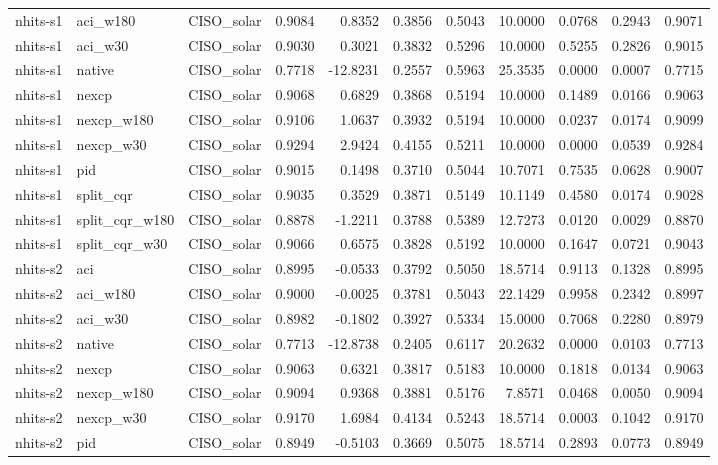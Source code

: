 \begin{tabular}{lllrrrrrrrr}
nhits-s1 & aci_w180 & CISO_solar & 0.9084 & 0.8352 & 0.3856 & 0.5043 & 10.0000 & 0.0768 & 0.2943 & 0.9071 \\
nhits-s1 & aci_w30 & CISO_solar & 0.9030 & 0.3021 & 0.3832 & 0.5296 & 10.0000 & 0.5255 & 0.2826 & 0.9015 \\
nhits-s1 & native & CISO_solar & 0.7718 & -12.8231 & 0.2557 & 0.5963 & 25.3535 & 0.0000 & 0.0007 & 0.7715 \\
nhits-s1 & nexcp & CISO_solar & 0.9068 & 0.6829 & 0.3868 & 0.5194 & 10.0000 & 0.1489 & 0.0166 & 0.9063 \\
nhits-s1 & nexcp_w180 & CISO_solar & 0.9106 & 1.0637 & 0.3932 & 0.5194 & 10.0000 & 0.0237 & 0.0174 & 0.9099 \\
nhits-s1 & nexcp_w30 & CISO_solar & 0.9294 & 2.9424 & 0.4155 & 0.5211 & 10.0000 & 0.0000 & 0.0539 & 0.9284 \\
nhits-s1 & pid & CISO_solar & 0.9015 & 0.1498 & 0.3710 & 0.5044 & 10.7071 & 0.7535 & 0.0628 & 0.9007 \\
nhits-s1 & split_cqr & CISO_solar & 0.9035 & 0.3529 & 0.3871 & 0.5149 & 10.1149 & 0.4580 & 0.0174 & 0.9028 \\
nhits-s1 & split_cqr_w180 & CISO_solar & 0.8878 & -1.2211 & 0.3788 & 0.5389 & 12.7273 & 0.0120 & 0.0029 & 0.8870 \\
nhits-s1 & split_cqr_w30 & CISO_solar & 0.9066 & 0.6575 & 0.3828 & 0.5192 & 10.0000 & 0.1647 & 0.0721 & 0.9043 \\
nhits-s2 & aci & CISO_solar & 0.8995 & -0.0533 & 0.3792 & 0.5050 & 18.5714 & 0.9113 & 0.1328 & 0.8995 \\
nhits-s2 & aci_w180 & CISO_solar & 0.9000 & -0.0025 & 0.3781 & 0.5043 & 22.1429 & 0.9958 & 0.2342 & 0.8997 \\
nhits-s2 & aci_w30 & CISO_solar & 0.8982 & -0.1802 & 0.3927 & 0.5334 & 15.0000 & 0.7068 & 0.2280 & 0.8979 \\
nhits-s2 & native & CISO_solar & 0.7713 & -12.8738 & 0.2405 & 0.6117 & 20.2632 & 0.0000 & 0.0103 & 0.7713 \\
nhits-s2 & nexcp & CISO_solar & 0.9063 & 0.6321 & 0.3817 & 0.5183 & 10.0000 & 0.1818 & 0.0134 & 0.9063 \\
nhits-s2 & nexcp_w180 & CISO_solar & 0.9094 & 0.9368 & 0.3881 & 0.5176 & 7.8571 & 0.0468 & 0.0050 & 0.9094 \\
nhits-s2 & nexcp_w30 & CISO_solar & 0.9170 & 1.6984 & 0.4134 & 0.5243 & 18.5714 & 0.0003 & 0.1042 & 0.9170 \\
nhits-s2 & pid & CISO_solar & 0.8949 & -0.5103 & 0.3669 & 0.5075 & 18.5714 & 0.2893 & 0.0773 & 0.8949 \\

\end{tabular}
